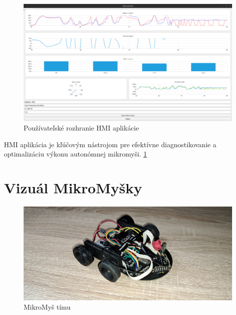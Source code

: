 \begin{figure}[!htpb]
	\centering
	\includegraphics[width=14cm]{includes//images/image.png}
	\caption{Používateľské rozhranie HMI aplikácie }
	\label{fig:UDP}
\end{figure}

HMI aplikácia je kľúčovým nástrojom pre efektívne diagnostikovanie a optimalizáciu výkonu autonómnej mikromyši. \ref{fig:UDP} 
\section{Vizuál MikroMyšky}
\begin{figure}[!htpb]
    \centering
    \includegraphics[width=14cm]{includes/images/potkan.jpg}
    \caption{MikroMyš tímu}
    \label{fig:Potkan}
\end{figure}